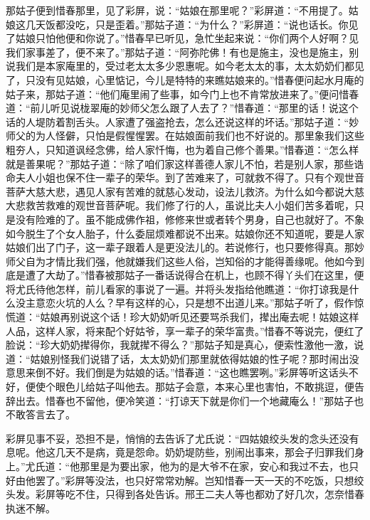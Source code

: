 \begin{parag}
    那姑子便到惜春那里，见了彩屏，说：“姑娘在那里呢？”彩屏道：“不用提了。姑娘这几天饭都没吃，只是歪着。”那姑子道：“为什么？”彩屏道：“说也话长。你见了姑娘只怕他便和你说了。”惜春早已听见，急忙坐起来说：“你们两个人好啊？见我们家事差了，便不来了。”那姑子道：“阿弥陀佛！有也是施主，没也是施主，别说我们是本家庵里的，受过老太太多少恩惠呢。如今老太太的事，太太奶奶们都见了，只没有见姑娘，心里惦记，今儿是特特的来瞧姑娘来的。”惜春便问起水月庵的姑子来，那姑子道：“他们庵里闹了些事，如今门上也不肯常放进来了。”便问惜春道：“前儿听见说栊翠庵的妙师父怎么跟了人去了？”惜春道：“那里的话！说这个话的人堤防着割舌头。人家遭了强盗抢去，怎么还说这样的坏话。”那姑子道：“妙师父的为人怪僻，只怕是假惺惺罢。在姑娘面前我们也不好说的。那里象我们这些粗夯人，只知道讽经念佛，给人家忏悔，也为着自己修个善果。”惜春道：“怎么样就是善果呢？”那姑子道：“除了咱们家这样善德人家儿不怕，若是别人家，那些诰命夫人小姐也保不住一辈子的荣华。到了苦难来了，可就救不得了。只有个观世音菩萨大慈大悲，遇见人家有苦难的就慈心发动，设法儿救济。为什么如今都说大慈大悲救苦救难的观世音菩萨呢。我们修了行的人，虽说比夫人小姐们苦多着呢，只是没有险难的了。虽不能成佛作祖，修修来世或者转个男身，自己也就好了。不象如今脱生了个女人胎子，什么委屈烦难都说不出来。姑娘你还不知道呢，要是人家姑娘们出了门子，这一辈子跟着人是更没法儿的。若说修行，也只要修得真。那妙师父自为才情比我们强，他就嫌我们这些人俗，岂知俗的才能得善缘呢。他如今到底是遭了大劫了。”惜春被那姑子一番话说得合在机上，也顾不得丫头们在这里，便将尤氏待他怎样，前儿看家的事说了一遍。并将头发指给他瞧道：“你打谅我是什么没主意恋火坑的人么？早有这样的心，只是想不出道儿来。”那姑子听了，假作惊慌道：“姑娘再别说这个话！珍大奶奶听见还要骂杀我们，撵出庵去呢！姑娘这样人品，这样人家，将来配个好姑爷，享一辈子的荣华富贵。”惜春不等说完，便红了脸说：“珍大奶奶撵得你，我就撵不得么？”那姑子知是真心，便索性激他一激，说道：“姑娘别怪我们说错了话，太太奶奶们那里就依得姑娘的性子呢？那时闹出没意思来倒不好。我们倒是为姑娘的话。”惜春道：“这也瞧罢咧。”彩屏等听这话头不好，便使个眼色儿给姑子叫他去。那姑子会意，本来心里也害怕，不敢挑逗，便告辞出去。惜春也不留他，便冷笑道：“打谅天下就是你们一个地藏庵么！”那姑子也不敢答言去了。
\end{parag}


\begin{parag}
    彩屏见事不妥，恐担不是，悄悄的去告诉了尤氏说：“四姑娘绞头发的念头还没有息呢。他这几天不是病，竟是怨命。奶奶堤防些，别闹出事来，那会子归罪我们身上。”尤氏道：“他那里是为要出家，他为的是大爷不在家，安心和我过不去，也只好由他罢了。”彩屏等没法，也只好常常劝解。岂知惜春一天一天的不吃饭，只想绞头发。彩屏等吃不住，只得到各处告诉。邢王二夫人等也都劝了好几次，怎奈惜春执迷不解。
\end{parag}


